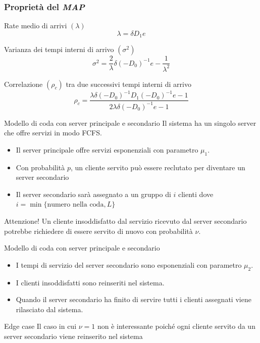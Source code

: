\documentclass{beamer}
\begin{document}
\begin{frame}
    \frametitle{Proprietà del \emph{MAP}}
        \begin{block}{Rate medio di arrivi $(\lambda)$}
            $$ \lambda = \delta D_1 e$$
        \end{block}
        \begin{block}{Varianza dei tempi interni di arrivo $(\sigma^2)$}
            $$ \sigma^2 = \frac{2}{\lambda} \delta (-D_0)^{-1} e - \frac{1}{\lambda^2}$$
        \end{block}
        \begin{block}{Correlazione $(\rho_c)$ tra due successivi tempi interni di arrivo}
            $$ \rho_c = \frac{\lambda \delta (-D_0)^{-1} D_1 (-D_0)^{-1} e - 1}{2 \lambda \delta (-D_0)^{-1} e - 1}$$
        \end{block}
\end{frame}


\begin{frame}{Modello di coda con server principale e secondario}
    Il sistema ha un singolo server che offre servizi in modo FCFS.
    \begin{itemize}
        \item Il server principale offre servizi esponenziali con parametro $\mu_1$.
        \item  Con probabilità $p$, un cliente servito può essere reclutato per diventare un server secondario
        \item Il server secondario sarà assegnato a un gruppo di $i$ clienti dove $i = \min \{\text{numero nella coda}, L\}$
    \end{itemize}
    \begin{block}{Attenzione!}
        Un cliente insoddisfatto dal servizio ricevuto dal server secondario potrebbe richiedere di essere servito di nuovo con probabilità $\nu$.
    \end{block}
\end{frame}


\begin{frame}{Modello di coda con server principale e secondario}
    \begin{itemize}
        \item I tempi di servizio del server secondario sono esponenziali con parametro $\mu_2$.
        \item I clienti insoddisfatti sono reinseriti nel sistema.
        \item Quando il server secondario ha finito di servire tutti i clienti assegnati viene rilasciato dal sistema.
    \end{itemize}
    \begin{block}{Edge case}
        Il caso in cui $\nu = 1$ non è interessante poiché ogni cliente servito da un server secondario viene reinserito nel sistema
    \end{block}
\end{frame}
\end{document}
